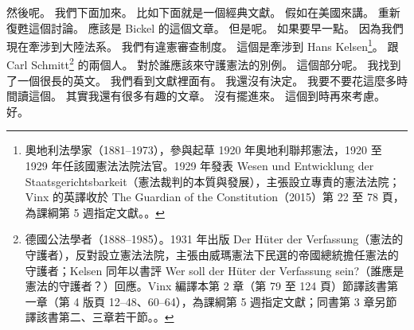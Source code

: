 \hypertarget{w01:cue:411}{}然後呢。
\hypertarget{w01:cue:412}{}我們下面加來。
\hypertarget{w01:cue:413}{}比如下面就是一個經典文獻。
\hypertarget{w01:cue:414}{}假如在美國來講。
\hypertarget{w01:cue:415}{}重新復甦這個討論。
\hypertarget{w01:cue:416}{}應該是 Bickel 的這個文章。
\hypertarget{w01:cue:417}{}但是呢。
\hypertarget{w01:cue:418}{}如果要早一點。
\hypertarget{w01:cue:419}{}因為我們現在牽涉到大陸法系。
\hypertarget{w01:cue:420}{}我們有違憲審查制度。
\hypertarget{w01:cue:421}{}這個是牽涉到 Hans Kelsen\footnote{奧地利法學家（1881–1973），參與起草 1920 年奧地利聯邦憲法，1920 至 1929 年任該國憲法法院法官。1929 年發表 Wesen und Entwicklung der Staatsgerichtsbarkeit（憲法裁判的本質與發展），主張設立專責的憲法法院；Vinx 的英譯收於 The Guardian of the Constitution（2015）第 22 至 78 頁，為課綱第 5 週指定文獻。\cite{kelsen2015}。}。
\hypertarget{w01:cue:422}{}跟 Carl Schmitt\footnote{德國公法學者（1888–1985）。1931 年出版 Der Hüter der Verfassung（憲法的守護者），反對設立憲法法院，主張由威瑪憲法下民選的帝國總統擔任憲法的守護者；Kelsen 同年以書評 Wer soll der Hüter der Verfassung sein?（誰應是憲法的守護者？）回應。Vinx 編譯本第 2 章（第 79 至 124 頁）節譯該書第一章（第 4 版頁 12–48、60–64），為課綱第 5 週指定文獻；同書第 3 章另節譯該書第二、三章若干節。\cite{schmitt2015}。} 的兩個人。
\hypertarget{w01:cue:423}{}對於誰應該來守護憲法的別例。
\hypertarget{w01:cue:424}{}這個部分呢。
\hypertarget{w01:cue:425}{}我找到了一個很長的英文。
\hypertarget{w01:cue:426}{}我們看到文獻裡面有。
\hypertarget{w01:cue:427}{}我還沒有決定。
\hypertarget{w01:cue:428}{}我要不要花這麼多時間讀這個。
\hypertarget{w01:cue:429}{}其實我還有很多有趣的文章。
\hypertarget{w01:cue:430}{}沒有擺進來。
\hypertarget{w01:cue:431}{}這個到時再來考慮。
\hypertarget{w01:cue:432}{}好。

